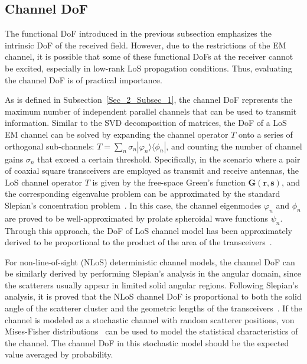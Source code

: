 \documentclass[journal,twocolumn]{IEEEtran}
\begin{document}
\vspace{-1em}
\subsection{Channel DoF}
The functional DoF introduced in the previous subsection emphasizes the intrinsic DoF of the received field. 
However, due to the restrictions of the EM channel, it is possible that some of these functional DoFs at the receiver cannot be excited, especially in low-rank LoS propagation conditions. Thus, evaluating the channel DoF is of practical importance.  

As is defined in Subsection~\ref{Sec_2_Subsec_1}, the channel DoF represents the maximum number of independent parallel channels that can be used to transmit information. 
Similar to the SVD decomposition of matrices, the DoF of a LoS EM channel can be solved by expanding the channel operator $T$ onto a series of orthogonal sub-channels: $T=\sum_n \sigma_n |\varphi_n\rangle\langle\phi_n|$, and counting the number of channel gains $\sigma_n$ that exceed a certain threshold. 
Specifically, in the scenario where a pair of coaxial square transceivers are employed as transmit and receive antennas, the LoS channel operator $T$ is given by the free-space Green's function ${\bm G}({\bm r}, {\bm s})$, and the corresponding eigenvalue problem can be approximated by the standard Slepian's concentration problem~\cite{miller2000communicating}. In this case, the channel eigenmodes $\varphi_n$ and $\phi_n$ are proved to be well-approximated by prolate spheroidal wave functions $\psi_n$.   
Through this approach, the DoF of LoS channel model has been approximately derived to be proportional to the product of the area of the transceivers~\cite{pizzo2022nyquist,miller2000communicating}. 

For non-line-of-sight (NLoS) deterministic channel models, the channel DoF can be similarly derived by performing Slepian's analysis in the angular domain, since the scatterers usually appear in limited solid angular regions. 
Following Slepian's analysis, it is proved that the NLoS channel DoF is proportional to both the solid angle of the scatterer cluster and the geometric lengths of the transceivers~\cite{poon2005degrees}.   
If the channel is modeled as a stochastic channel with random scatterer positions, von Mises-Fisher distributions~\cite{byers2004spatially} can be used to model the statistical characteristics of the channel. 
The channel DoF in this stochastic model should be the expected value averaged by probability.
\end{document}
